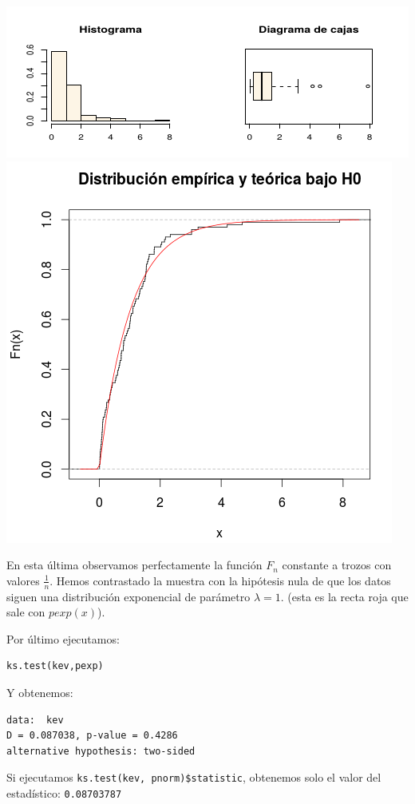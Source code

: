 \documentclass[palatino,nochap]{apuntes}
\begin{document}
\begin{example}
\includegraphics[scale=0.8]{img/contrasteks3.png}
\includegraphics[scale=0.5]{img/contrasteks4.png}

En esta última observamos perfectamente la función $F_n$ constante a trozos con valores $\frac{1}{n}$. Hemos contrastado la muestra con la hipótesis nula de que los datos siguen una distribución exponencial de parámetro $\lambda = 1$. (esta es la recta roja que sale con $pexp(x)$).

Por último ejecutamos:
\begin{verbatim}
ks.test(kev,pexp)
\end{verbatim}

Y obtenemos:
\begin{verbatim}
data:  kev
D = 0.087038, p-value = 0.4286
alternative hypothesis: two-sided
\end{verbatim}

Si ejecutamos \verb|ks.test(kev, pnorm)$statistic|, obtenemos solo el valor del estadístico: \verb|0.08703787| 

\end{example}
\end{document}
